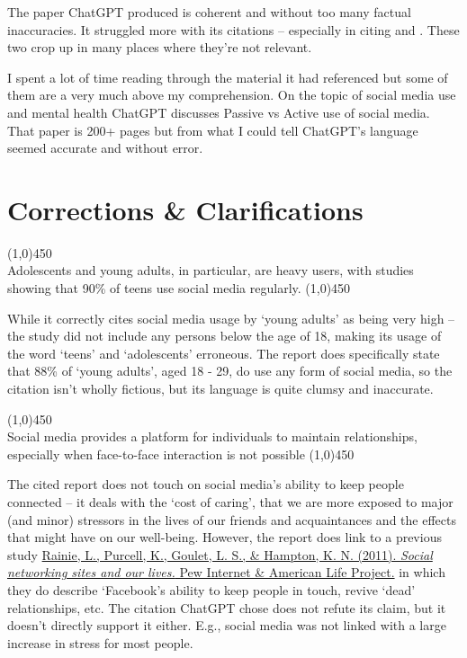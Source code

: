\documentclass[12pt]{article}
\begin{document}
The paper ChatGPT produced is coherent and without too many factual inaccuracies. It struggled more with its citations -- especially in citing \cite{smith2018} and \cite{statista2023}. These two crop up in many places where they're not relevant. 

I spent a lot of time reading through the material it had referenced but some of them are a very much above my comprehension. On the topic of social media use and mental health ChatGPT discusses Passive vs Active use of social media. That paper is 200+ pages but from what I could tell ChatGPT's language seemed accurate and without error. 

\section{Corrections \& Clarifications}

\begin{center}
    \line(1,0){450}\\
    Adolescents and young adults, in particular, are heavy users, with studies showing that 90\% of teens use social media regularly.\cite{smith2018}
    \line(1,0){450}
\end{center}
While it correctly cites social media usage by `young adults' as being very high -- the study did not include any persons below the age of 18, making its usage of the word `teens' and `adolescents' erroneous. The report does specifically state that 88\% of `young adults', aged 18 - 29, do use any form of social media, so the citation isn't wholly fictious, but its language is quite clumsy and inaccurate.

\begin{center}
    \line(1,0){450}\\
    Social media provides a platform for individuals to maintain relationships, especially when face-to-face interaction is not possible\cite{hampton2014}
    \line(1,0){450}
\end{center}
The cited report does not touch on social media's ability to keep people connected -- it deals with the `cost of caring', that we are more exposed to major (and minor) stressors in the lives of our friends and acquaintances and the effects that might have on our well-being. However, the report does link to a previous study  \href{https://www.pewresearch.org/internet/2011/06/16/social-networking-sites-and-our-lives/}{Rainie, L., Purcell, K., Goulet, L. S., \& Hampton, K. N. (2011). \textit{Social networking sites and our lives.} Pew Internet \& American Life Project.}
in which they do describe `Facebook's ability to keep people in touch, revive `dead' relationships, etc. The citation ChatGPT chose does not refute its claim, but it doesn't directly support it either. E.g., social media was not linked with a large increase in stress for most people.
\end{document}
